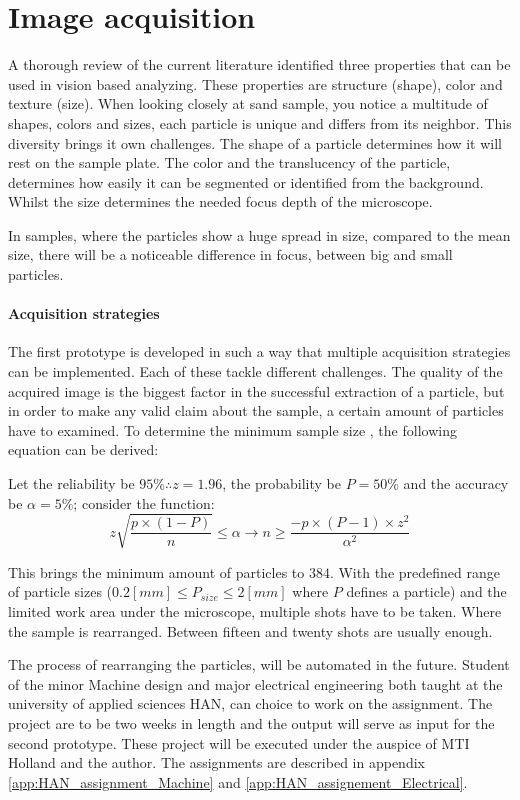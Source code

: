 \documentclass[11pt,fleqn,,a4paper,twoside,openright]{book}
\begin{document}
\section{Image acquisition}
A thorough review of the current literature \cite{Spijker14a} identified three properties that can be used in vision based analyzing. These properties are structure  (shape), color and texture  (size). When looking closely at sand sample, you notice a multitude of shapes, colors and sizes, each particle is unique and differs from its neighbor. This diversity brings it own challenges. The shape of a particle determines how it will rest on the sample plate. The color and the translucency of the particle, determines how easily it can be segmented or identified from the background. Whilst the size determines the needed focus depth of the microscope. 
\begin{remark}
	In samples, where the particles show a huge spread in size, compared to the mean size, there will be a noticeable difference in focus, between big and small particles. 
\end{remark}

\paragraph{Acquisition strategies}The first prototype is developed in such a way that multiple acquisition strategies can be implemented. Each of these tackle different challenges. The quality of the acquired image is the biggest factor in the successful extraction of a particle, but in order to make any valid claim about the sample, a certain amount of particles have to examined. To determine the minimum sample size , the following equation can be derived:
\begin{sBox}
	Let the reliability be $95\% \therefore z=1.96$, the probability be $P=50\%$ and the accuracy be $\alpha=5\%$; consider the function:
	\begin{equation}
	z\sqrt{\frac{p\times(1-P)}{n}}\leq\alpha \rightarrow n\geq\frac{-p\times(P-1)\times z^2}{\alpha^2}
	\end{equation}
\end{sBox}
This brings the minimum amount of particles to $384$. With the predefined range of particle sizes ($0.2[mm]\leq P_{size} \leq 2[mm]$ where $P$ defines a particle) and the limited work area under the microscope, multiple shots have to be taken. Where the sample is rearranged. Between fifteen and twenty shots are usually enough.
\begin{remark}
	 The process of rearranging the particles, will be automated in the future. Student of the minor Machine design and major electrical engineering both taught at the university of applied sciences HAN, can choice to work on the assignment. The project are to be two weeks in length and the output will serve as input for the second prototype. These project will be executed under the auspice of MTI Holland and the author. The assignments are described in appendix \ref{app:HAN_assignment_Machine} and \ref{app:HAN_assignement_Electrical}.
\end{remark}
\end{document}
